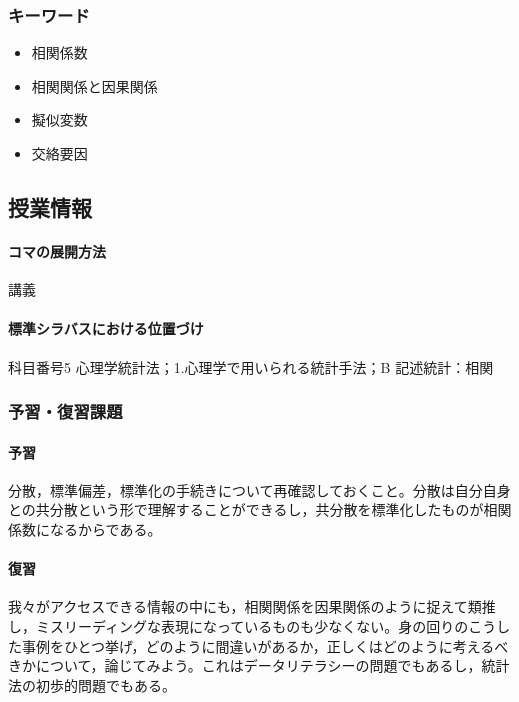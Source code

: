\subsubsection{キーワード}
\begin{itemize}
	\item 相関係数
	\item 相関関係と因果関係
	\item 擬似変数
	\item 交絡要因
\end{itemize}
\subsection{授業情報}
\paragraph{コマの展開方法}
講義
\paragraph{標準シラバスにおける位置づけ}
科目番号5 心理学統計法；1.心理学で用いられる統計手法；B 記述統計：相関
\subsubsection{予習・復習課題}
\paragraph{予習}
分散，標準偏差，標準化の手続きについて再確認しておくこと。分散は自分自身との共分散という形で理解することができるし，共分散を標準化したものが相関係数になるからである。
\paragraph{復習}
我々がアクセスできる情報の中にも，相関関係を因果関係のように捉えて類推し，ミスリーディングな表現になっているものも少なくない。身の回りのこうした事例をひとつ挙げ，どのように間違いがあるか，正しくはどのように考えるべきかについて，論じてみよう。これはデータリテラシーの問題でもあるし，統計法の初歩的問題でもある。